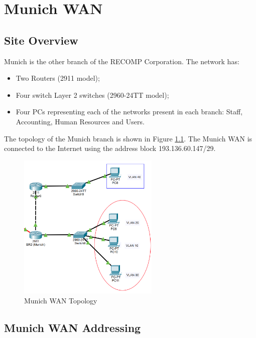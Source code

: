 \chapter{Munich WAN}

\section{Site Overview}
Munich is the other branch of the RECOMP Corporation. The network has:
\begin{itemize}
    \item Two Routers (2911 model);
    \item Four switch Layer 2 switches (2960-24TT model);
    \item Four PCs representing each of the networks present in each branch: Staff, Accounting, Human Resources and Users.
\end{itemize}

The topology of the Munich branch is shown in Figure \ref{fig:munichtopology}. The Munich \ac{WAN} is connected to the Internet using the address block 193.136.60.147/29.


\begin{figure}[!htb]
\centering
\includegraphics[width=0.6\textwidth]{figures/munich_topology.png}
\caption{\label{fig:munichtopology}Munich WAN Topology}
\end{figure}

\section{Munich WAN Addressing}

